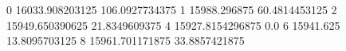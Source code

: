 0 16033.908203125 106.0927734375
1 15988.296875 60.4814453125
2 15949.650390625 21.8349609375
4 15927.8154296875 0.0
6 15941.625 13.8095703125
8 15961.701171875 33.8857421875
